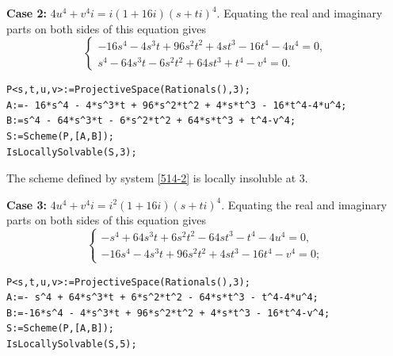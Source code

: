 \documentclass[a4paper,12pt,english,reqno]{amsart}
\begin{document}
{\bf Case 2:} $4u^4+v^4i=i(1+16i)(s+ti)^4$. Equating the real and imaginary parts on both sides of this equation gives
\begin{equation}\label{514-2}
\begin{cases}
-16s^4 - 4s^3t + 96s^2t^2 + 4st^3 - 16t^4 - 4u^4=0,\\
s^4 - 64s^3t - 6s^2t^2 + 64st^3 + t^4 - v^4=0.
\end{cases}
\end{equation}

\begin{lstlisting}
P<s,t,u,v>:=ProjectiveSpace(Rationals(),3);
A:=- 16*s^4 - 4*s^3*t + 96*s^2*t^2 + 4*s*t^3 - 16*t^4-4*u^4;
B:=s^4 - 64*s^3*t - 6*s^2*t^2 + 64*s*t^3 + t^4-v^4;
S:=Scheme(P,[A,B]);
IsLocallySolvable(S,3);
\end{lstlisting}

The scheme defined by system \eqref{514-2} is locally insoluble at $3$.

{\bf Case 3:} $4u^4+v^4i=i^2(1+16i)(s+ti)^4$. Equating the real and imaginary parts on both sides of this equation gives
\begin{equation}\label{514-3}
\begin{cases}
- s^4 + 64s^3t + 6s^2t^2 - 64st^3 - t^4-4u^4=0,\\
-16s^4 - 4s^3t + 96s^2t^2 + 4st^3 - 16t^4-v^4=0;
\end{cases}
\end{equation}

\begin{lstlisting}
P<s,t,u,v>:=ProjectiveSpace(Rationals(),3);
A:=- s^4 + 64*s^3*t + 6*s^2*t^2 - 64*s*t^3 - t^4-4*u^4;
B:=-16*s^4 - 4*s^3*t + 96*s^2*t^2 + 4*s*t^3 - 16*t^4-v^4;
S:=Scheme(P,[A,B]);
IsLocallySolvable(S,5);
\end{lstlisting}
\end{document}
